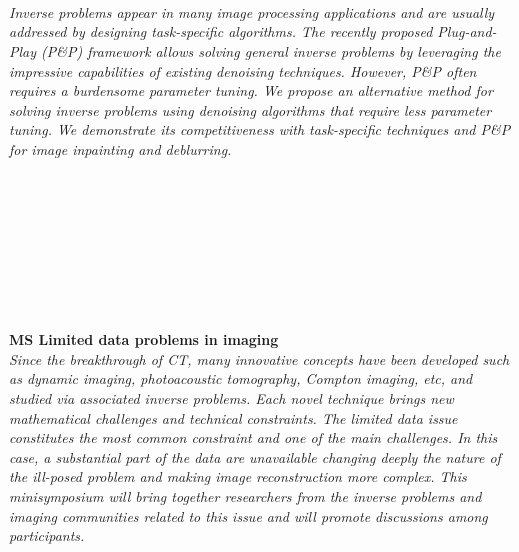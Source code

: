 \begin{multicols}{2}
        \\
        \\\\
        \\
        \\\\
        \\
        \\\\
        \\
        \\\\
\\
      \textit{Inverse problems appear in many image processing applications and are usually addressed by designing task-specific algorithms. The recently proposed Plug-and-Play (P\&P) framework allows solving general inverse problems by leveraging the impressive capabilities of existing denoising techniques. However, P\&P often requires a burdensome parameter tuning. We propose an alternative method for solving inverse problems using denoising algorithms that require less parameter tuning. We demonstrate its competitiveness with task-specific techniques and P\&P for image inpainting and deblurring.}\\
\\ 
        \\
        \\\\
        \\
        \\\\
\\
\end{multicols}
  \noindent\textbf{MS Limited data problems in imaging}\\
  \textit{Since the breakthrough of CT, many innovative concepts have been developed such as dynamic imaging, photoacoustic tomography, Compton imaging, etc, and studied via associated inverse problems. Each novel technique brings new mathematical challenges and technical constraints. The limited data issue constitutes the most common constraint and one of the main challenges. In this case, a substantial part of the data are unavailable changing deeply the nature of the ill-posed problem and making image reconstruction more complex. This minisymposium will bring together researchers from the inverse problems and imaging communities related to this issue and will promote discussions among participants.} \\
    
